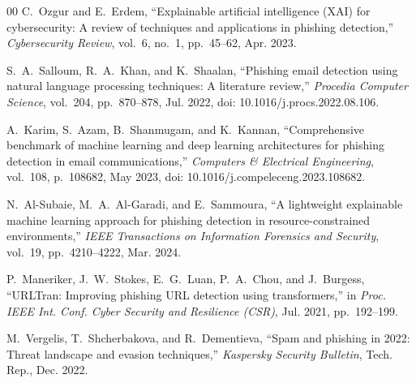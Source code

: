 \documentclass[conference]{IEEEtran}
\begin{document}
\begin{thebibliography}{00}
C.~Ozgur and E.~Erdem, ``Explainable artificial intelligence (XAI) for cybersecurity: A review of techniques and applications in phishing detection,'' \emph{Cybersecurity Review}, vol.~6, no.~1, pp.~45--62, Apr. 2023.

S.~A.~Salloum, R.~A.~Khan, and K.~Shaalan, ``Phishing email detection using natural language processing techniques: A literature review,'' \emph{Procedia Computer Science}, vol.~204, pp.~870--878, Jul. 2022, doi: 10.1016/j.procs.2022.08.106.

A.~Karim, S.~Azam, B.~Shanmugam, and K.~Kannan, ``Comprehensive benchmark of machine learning and deep learning architectures for phishing detection in email communications,'' \emph{Computers \& Electrical Engineering}, vol.~108, p.~108682, May 2023, doi: 10.1016/j.compeleceng.2023.108682.

N.~Al-Subaie, M.~A.~Al-Garadi, and E.~Sammoura, ``A lightweight explainable machine learning approach for phishing detection in resource-constrained environments,'' \emph{IEEE Transactions on Information Forensics and Security}, vol.~19, pp.~4210--4222, Mar. 2024.

P.~Maneriker, J.~W.~Stokes, E.~G.~Luan, P.~A.~Chou, and J.~Burgess, ``URLTran: Improving phishing URL detection using transformers,'' in \emph{Proc. IEEE Int. Conf. Cyber Security and Resilience (CSR)}, Jul. 2021, pp.~192--199.

M.~Vergelis, T.~Shcherbakova, and R.~Dementieva, ``Spam and phishing in 2022: Threat landscape and evasion techniques,'' \emph{Kaspersky Security Bulletin}, Tech. Rep., Dec. 2022.

\end{thebibliography}
\end{document}
